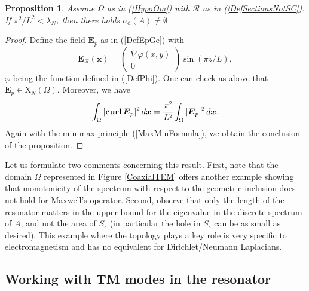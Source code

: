 \documentclass[11pt,a4paper]{article}
\newcommand{\Om}{\Omega}
\newcommand{\mrm}[1]{\mathrm{#1}}
\newcommand{\bfx}{\boldsymbol{x}}
\newcommand{\mX}{\mrm{X}}
\newcommand{\curlvec}{\boldsymbol{\mrm{curl}}\,}
\def\E{\boldsymbol{E}}
\newtheorem{proposition}[theorem]{Proposition}
\begin{document}
\begin{proposition}
Assume $\Om$ as in (\ref{HypoOm}) with $\mathcal{R}$ as in (\ref{DefSectionsNotSC}). If $\pi^2/L^2<\lambda_N$, then there holds $\sigma_{\mrm{d}}(A)\ne\emptyset$. 
\end{proposition}
\begin{proof}
Define the field $\E_{p}$ as in (\ref{DefEpGe}) with 
\[
\E_\mathcal{R}(\bfx)= \left( \begin{array}{c}
\nabla \varphi(x,y) \\[2pt]
0
\end{array}
\right)\sin(\pi z/L),
\]
$\varphi$ being the function defined in (\ref{DefPhi}). One can check as above that $\E_p\in\boldsymbol{\mX}_N(\Om)$. Moreover, we have 
\[
 \int_{\Om} |\curlvec\E_p|^2\,d\bfx = \cfrac{\pi^2}{L^2}\int_{\Om} |\E_p|^2\,d\bfx .
\]
Again with the min-max principle (\ref{MaxMinFormula}), we obtain the conclusion of the proposition.
\end{proof}
\noindent Let us formulate two comments concerning this result. First, note that the domain $\Om$ represented in Figure \ref{CoaxialTEM} offers another example showing that monotonicity of the spectrum with respect to the geometric inclusion does not hold for Maxwell's operator. Second, observe that only the length of the resonator matters in the upper bound for the eigenvalue in the discrete spectrum of $A$, and not the area of $S_\circ$ (in particular the hole in $S_\circ$ can be as small as desired). This example where the topology plays a key role is very specific to electromagnetism and has no equivalent for Dirichlet/Neumann Laplacians.


\subsection{Working with TM modes in the resonator}\label{ParaTMmodes}
\end{document}
